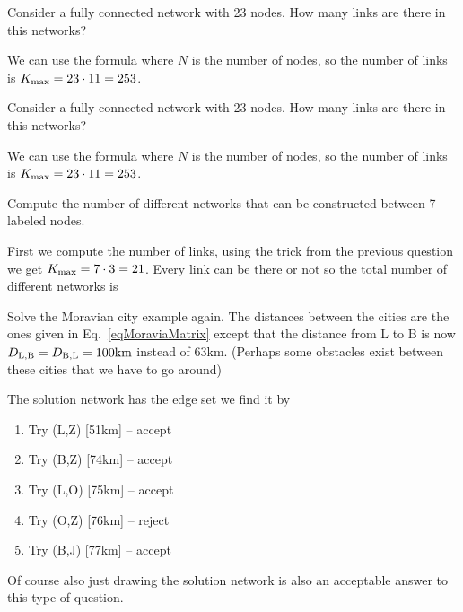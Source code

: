 Consider a fully connected network with 23 nodes. How many links are there in this networks?


\solution
We can use the formula
where $N$ is the number of nodes, so the number of links is $K_{\rm max}=23\cdot 11 = 253$.




Consider a fully connected network with 23 nodes. How many links are there in this networks?


\solution
We can use the formula
where $N$ is the number of nodes, so the number of links is $K_{\rm max}=23\cdot 11 = 253$.



Compute the number of different networks that can be constructed between 7 labeled nodes.


\solution
First we compute the number of links, using the trick from the previous question we get $K_{\rm max}=7 \cdot 3=21$. Every link can be there or not so the total number of different networks is 







 Solve the Moravian city example again. The distances between the cities are the ones given in Eq.~\ref{eqMoraviaMatrix} except that the distance from L to B is now $D_{\rm L,\rm B}=D_{\rm B,\rm L}=100{\rm km}$ instead of 63km. (Perhaps some obstacles exist between these cities that we have to go around) 


\solution
The solution network has the edge set 
we find it by
\begin{enumerate}
    \item Try (L,Z) [51km] -- accept
    \item Try (B,Z) [74km] -- accept
    \item Try (L,O) [75km] -- accept
    \item Try (O,Z) [76km] -- reject
    \item Try (B,J) [77km] -- accept 
\end{enumerate}
Of course also just drawing the solution network is also an acceptable answer to this type of question.


